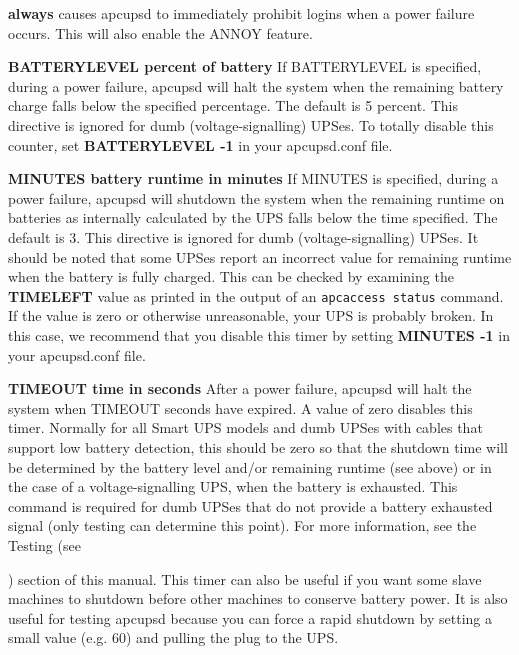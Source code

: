 {{{{{{{{{{{\begin{description}
\begin{description}
\item {\bf always}
causes apcupsd to immediately prohibit logins when a power failure occurs.
This will also enable the ANNOY feature. 
\end{description}


\item {\bf BATTERYLEVEL \lt{}percent of battery\gt{}}
If BATTERYLEVEL is specified, during a power failure, apcupsd will halt the
system when the remaining battery charge falls below the specified percentage.
The default is 5 percent. This directive is ignored for dumb
(voltage-signalling) UPSes. To totally disable this counter, set {\bf
BATTERYLEVEL -1} in your apcupsd.conf file.  

\item {\bf MINUTES \lt{}battery runtime in minutes\gt{}}
If MINUTES is specified, during a power failure, apcupsd will shutdown the
system when the remaining runtime on batteries as internally calculated by the
UPS falls below the time specified. The default is 3. This directive is
ignored for dumb (voltage-signalling) UPSes. It should be noted that some
UPSes report an incorrect value for remaining runtime when the battery is
fully charged. This can be checked by examining the {\bf TIMELEFT} value as
printed in the output of an {\tt apcaccess status} command. If the value is
zero or otherwise unreasonable, your UPS is probably broken. In this case, we
recommend that you disable this timer by setting {\bf MINUTES -1} in your
apcupsd.conf file.  

\item {\bf TIMEOUT \lt{}time in seconds\gt{}}
After a power failure, apcupsd will halt the system when TIMEOUT seconds have
expired.  A value of zero disables this timer. Normally for all Smart UPS
models and dumb UPSes with cables that support low battery detection, this
should be zero so that the shutdown time will be determined by the battery
level and/or remaining runtime (see above) or in the case of a
voltage-signalling UPS, when the battery is exhausted.  This command is
required for dumb UPSes that do not provide a battery exhausted signal (only
testing can determine this point).  For more information, see the Testing (see

) section of this manual. 
This timer can also be useful if you want some slave machines to shutdown
before other machines to conserve battery power.  It is also useful for
testing apcupsd because you can force a rapid shutdown by setting a small
value (e.g.  60) and pulling the plug to the UPS.  


\end{description}}}}}}}}}}}}
